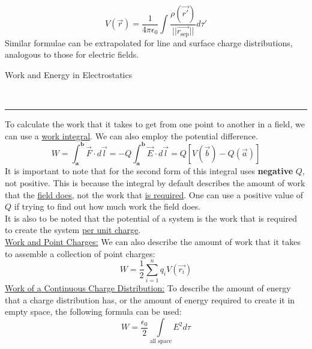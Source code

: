 \documentclass{article}
\newcommand{\sepvec}{\vec{r_\textrm{sep}}}
\newcommand{\kfrac}{\frac{1}{4\pi\epsilon_0}}
\newcommand{\header}[1]{\begin{large}\noindent #1\end{large}\\\rule{\textwidth}{0.5pt}}
\newcommand{\gap}{\medskip\\}
\newcommand{\sheader}[1]{\underline{#1:}}
\begin{document}
\[
    V(\vec{r}) = \kfrac \int{\frac{\rho(\vec{r'})}{||\sepvec||}d\tau'}
\]
Similar formulae can be extrapolated for line and surface charge distributions, analogous
to those for electric fields.
\pagebreak
\gap
\header{Work and Energy in Electrostatics}
To calculate the work that it takes to get from one point to another in a field,
we can use a \underline{work integral}. We can also employ the potential difference.
\[
    W = \int_{\textbf{a}}^{\textbf{b}} \vec{F} \cdot d\vec{l} = -Q\int_{\textbf{a}}^{\textbf{b}}{\vec{E} \cdot d\vec{l}} = Q[V(\vec{b}) - Q(\vec{a})]
\]
It is important to note that for the second form of this integral uses \textbf{negative} $Q$,
not positive. This is because the integral by default describes the amount of work that
the \underline{field does}, not the work that \underline{is required}. One can use 
a positive value of $Q$ if trying to find out how much work the field does.
\gap
It is also to be noted that the potential of a system is the work that is required
to create the system \underline{per unit charge}.
\gap
\sheader{Work and Point Charges} We can also describe the amount of work that it takes
to assemble a collection of point charges:
\[
    W = \frac{1}{2}\sum_{i = 1}^n{q_i V(\vec{r_i})}    
\]
\sheader{Work of a Continuous Charge Distribution} To describe the amount of energy
that a charge distribution has, or the amount of energy required to create it in 
empty space, the following formula can be used:
\[
    W = \frac{\epsilon_0}{2}\int\limits_{\textrm{all space}}E^2 d\tau    
\]
\end{document}

